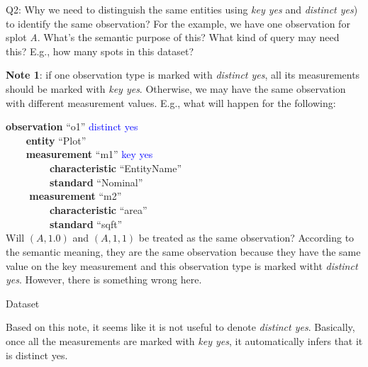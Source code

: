 \documentclass[10pt]{article}
\begin{document}
Q2: Why we need to distinguish the same entities using {\em key yes} and {\em distinct yes}) to identify the same observation? 
For the example, we have one observation for splot {\em A}.
What's the semantic purpose of this? What kind of query may need this? 
E.g., how many spots in this dataset? 

{\bf Note 1}: if one observation type is marked with {\em distinct yes}, all its measurements should be marked with {\em key yes}. 
Otherwise, we may have the same observation with different measurement values. 
E.g., what will happen for the following: 

\noindent
{\bf observation} ``o1''  \textcolor{blue}{distinct yes}\\
\verb|    |{\bf  entity} ``Plot''\\
\verb|    |{\bf measurement} ``m1'' \textcolor{blue}{key yes}\\
\verb|        | {\bf characteristic} ``EntityName'' \\
\verb|        | {\bf standard} ``Nominal''\\
\verb|    | {\bf measurement} ``m2''\\
\verb|        | {\bf characteristic} ``area'' \\
\verb|        | {\bf standard} ``sqft''\\

Will $(A, 1.0)$ and $(A,1,1)$ be treated as the same observation? 
According to the semantic meaning, they are the same observation because they have the same value on the key measurement and this observation type is marked witht {\em distinct yes}. 
However, there is something wrong here. 


\begin{table}[htb]
\begin{center}

\end{center}
\vspace{-0.2in}
\caption{Dataset}
\end{table}

Based on this note, it seems like it is not useful to denote {\em distinct yes}.
Basically, once all the measurements are marked with {\em key yes}, it automatically infers that it is distinct yes. 
\end{document}
